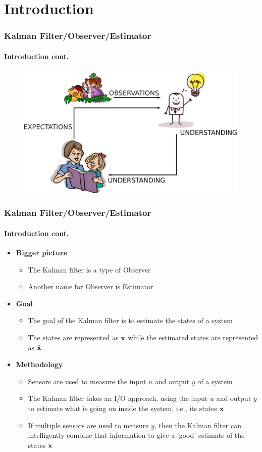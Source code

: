\section{Introduction}


\begin{frame}\pw\Large
\frametitle{Kalman Filter/Observer/Estimator}
\framesubtitle{Introduction \tiny cont.}
\begin{figure}
\includegraphics[width=1\textwidth]{figs/WFAR11_UCP_Update_Prediction_BlockDiagram-1.pdf}
\end{figure}
\end{frame}


\begin{frame}\pw\Large
\frametitle{Kalman Filter/Observer/Estimator}
\framesubtitle{Introduction \tiny cont.}
\begin{itemize}
\item \textbf{Bigger picture}
\begin{itemize}\scriptsize
\item The Kalman filter is a type of {\color{blue}Observer}
\item Another name for Observer is Estimator
\end{itemize}
\item \textbf{Goal}
\begin{itemize}\scriptsize
\item The goal of the Kalman filter is to estimate the states of a system
\item The states are represented as $\textbf{x}$ while the estimated states are represented as $\hat{\textbf{x}}$
\end{itemize}
\item \textbf{Methodology}
\begin{itemize}\scriptsize
\item Sensors are used to measure the input $u$ and output $y$ of a system
\item The Kalman filter takes an I/O approach, using the input $u$ and output $y$ to estimate what is going on inside the system, i.e., its states $\textbf{x}$
\item If multiple sensors are used to measure $y$, then the Kalman filter can intelligently combine that information to give a 'good' estimate of the states $\textbf{x}$
\end{itemize}
\end{itemize}
\end{frame}




